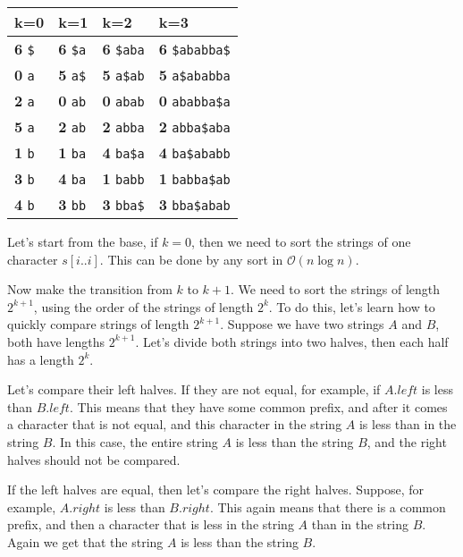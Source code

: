 \documentclass[11pt]{article}
\begin{document}
\begin{center}
\begin{tabular}{llll}
k=0 & k=1 & k=2 & k=3\\
\hline
\textbf{6} \texttt{\$} & \textbf{6} \texttt{\$a} & \textbf{6} \texttt{\$aba} & \textbf{6} \texttt{\$ababba\$}\\
\textbf{0} \texttt{a} & \textbf{5} \texttt{a\$} & \textbf{5} \texttt{a\$ab} & \textbf{5} \texttt{a\$ababba}\\
\textbf{2} \texttt{a} & \textbf{0} \texttt{ab} & \textbf{0} \texttt{abab} & \textbf{0} \texttt{ababba\$a}\\
\textbf{5} \texttt{a} & \textbf{2} \texttt{ab} & \textbf{2} \texttt{abba} & \textbf{2} \texttt{abba\$aba}\\
\textbf{1} \texttt{b} & \textbf{1} \texttt{ba} & \textbf{4} \texttt{ba\$a} & \textbf{4} \texttt{ba\$ababb}\\
\textbf{3} \texttt{b} & \textbf{4} \texttt{ba} & \textbf{1} \texttt{babb} & \textbf{1} \texttt{babba\$ab}\\
\textbf{4} \texttt{b} & \textbf{3} \texttt{bb} & \textbf{3} \texttt{bba\$} & \textbf{3} \texttt{bba\$abab}\\
\end{tabular}
\end{center}

Let's start from the base, if \(k = 0\), then we need to sort the strings of one character
\(s[i..i]\). This can be done by any sort in \(\mathcal{O}(n \log n)\).

Now make the transition from \(k\) to \(k + 1\). We need to sort the strings of length \(2^{k + 1}\),
using the order of the strings of length \(2^k\). To do this, let's learn how to quickly compare
strings of length \(2^{k + 1}\). Suppose we have two strings \(A\) and \(B\), both have lengths \(2^{k +
   1}\). Let's divide both strings into two halves, then each half has a length \(2^k\).

Let's compare their left halves. If they are not equal, for example, if \(A.left\) is less than
\(B.left\). This means that they have some common prefix, and after it comes a character that is
not equal, and this character in the string \(A\) is less than in the string \(B\). In this case, the
entire string \(A\) is less than the string \(B\), and the right halves should not be compared.

If the left halves are equal, then let's compare the right halves. Suppose, for example, \(A.right\)
is less than \(B.right\). This again means that there is a common prefix, and then a character that
is less in the string \(A\) than in the string \(B\). Again we get that the string \(A\) is less than
the string \(B\).
\end{document}
